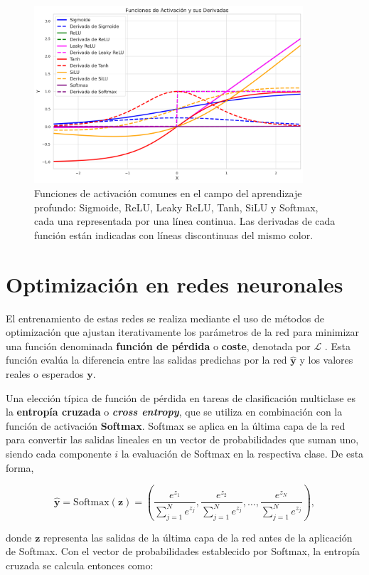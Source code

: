 \begin{figure}
	\centering
	\includegraphics[width=10cm]{img/activation_functions_figure.png}
	\caption{Funciones de activación comunes en el campo del aprendizaje profundo: Sigmoide, ReLU, Leaky ReLU, Tanh, SiLU y Softmax, cada una representada por una línea continua. Las derivadas de cada función están indicadas con líneas discontinuas del mismo color.}
	\label{fig:activation-functions}
\end{figure}

\section{Optimización en redes neuronales}

El entrenamiento de estas redes se realiza mediante el uso de métodos de optimización que ajustan iterativamente los parámetros de la red para minimizar una función denominada \textbf{función de pérdida} o \textbf{coste}, denotada por \(\mathcal{L}\) \cite{wang2020comprehensive}. Esta función evalúa la diferencia entre las salidas predichas por la red \(\mathbf{\hat{y}}\) y los valores reales o esperados \(\mathbf{y}\).

Una elección típica de función de pérdida en tareas de clasificación multiclase es la \textbf{entropía cruzada} o \textbf{\textit{cross entropy}}, que se utiliza en combinación con la función de activación \textbf{Softmax}. Softmax se aplica en la última capa de la red para convertir las salidas lineales en un vector de probabilidades que suman uno, siendo cada componente $i$ la evaluación de Softmax en la respectiva clase. De esta forma,

\[
\mathbf{\hat{y}} = \text{Softmax}(\mathbf{z}) = \left(\frac{e^{z_1}}{\sum_{j=1}^{N} e^{z_j}}, \frac{e^{z_2}}{\sum_{j=1}^{N} e^{z_j}}, \ldots, \frac{e^{z_N}}{\sum_{j=1}^{N} e^{z_j}}\right),
\]

donde \(\mathbf{z}\) representa las salidas de la última capa de la red antes de la aplicación de Softmax. Con el vector de probabilidades establecido por Softmax, la entropía cruzada se calcula entonces como:

